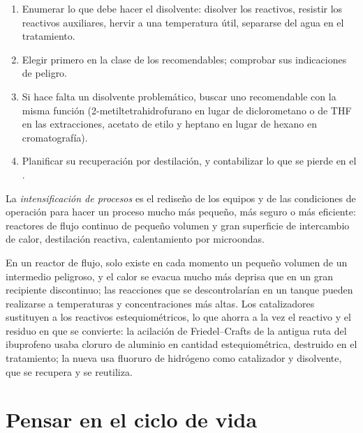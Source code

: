 \begin{method}\label{met:b3:green-industrial:solvent-choice}
\begin{enumerate}
  \item Enumerar lo que debe hacer el disolvente: disolver los reactivos, resistir los reactivos auxiliares,
        hervir a una temperatura útil, separarse del agua en el tratamiento.
  \item Elegir primero en la clase de los recomendables; comprobar sus indicaciones de peligro.
  \item Si hace falta un disolvente problemático, buscar uno recomendable con la misma
        función (2-metiltetrahidrofurano en lugar de diclorometano o de THF en las
        extracciones, acetato de etilo y heptano en lugar de hexano en cromatografía).
  \item Planificar su recuperación por destilación, y contabilizar lo que se pierde en el .
\end{enumerate}
\end{method}

\begin{definition}\label{def:b3:green-industrial:intensification}
La \emph{intensificación de procesos} es el
rediseño de los equipos y de las condiciones de operación para hacer un proceso mucho más pequeño,
más seguro o más eficiente: reactores de flujo continuo de pequeño volumen y
gran superficie de intercambio de calor, destilación reactiva, calentamiento por microondas.
\end{definition}

En un reactor de flujo, solo existe en cada momento un pequeño volumen de un intermedio peligroso,
y el calor se evacua mucho más deprisa que en un gran recipiente discontinuo; las reacciones
que se descontrolarían en un tanque pueden realizarse a temperaturas y
concentraciones más altas. Los catalizadores sustituyen a los reactivos estequiométricos, lo que ahorra a la vez el
reactivo y el residuo en que se convierte: la acilación de Friedel--Crafts de la antigua
ruta del ibuprofeno usaba cloruro de aluminio en cantidad estequiométrica, destruido en
el tratamiento; la nueva usa fluoruro de hidrógeno como catalizador y disolvente,
que se recupera y se reutiliza.

\section{Pensar en el ciclo de vida}

